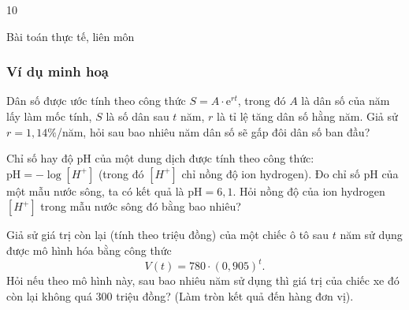 \begin{indapan}{10}
\begin{dang}{Bài toán thực tế, liên môn}
\end{dang}
\subsubsection{Ví dụ minh hoạ}

\begin{vd} 
	Dân số được ước tính theo công thức $S=A\cdot \mathrm{e}^{rt}$, trong đó $A$ là dân số của năm lấy làm mốc tính, $S$ là số dân sau $t$ năm, $r$ là tỉ lệ tăng dân số hằng năm. Giả sử $r=1{,}14\%$/năm, hỏi sau bao nhiêu năm dân số sẽ gấp đôi dân số ban đầu?
\end{vd}

\begin{vd} 
	Chỉ số hay độ pH của một dung dịch được tính theo công thức: $\text{pH} = -\log [H^+]$ (trong đó $[H^+]$ chỉ nồng độ ion hydrogen). Đo chỉ số pH của một mẫu nước sông, ta có kết quả là $\text{pH} =6{,}1$. Hỏi nồng độ của ion hydrogen $[H^+]$ trong mẫu nước sông đó bằng bao nhiêu?
\end{vd}

\begin{vd} 
	Giả sử giá trị còn lại (tính theo triệu đồng) của một chiếc ô tô sau $t$ năm sử dụng được mô hình hóa bằng công thức
	$$V(t)=780\cdot (0{,}905)^t.$$
	Hỏi nếu theo mô hình này, sau bao nhiêu năm sử dụng thì giá trị của chiếc xe đó còn lại không quá $300$ triệu đồng? (Làm tròn kết quả đến hàng đơn vị).
\end{vd}


\end{indapan}
